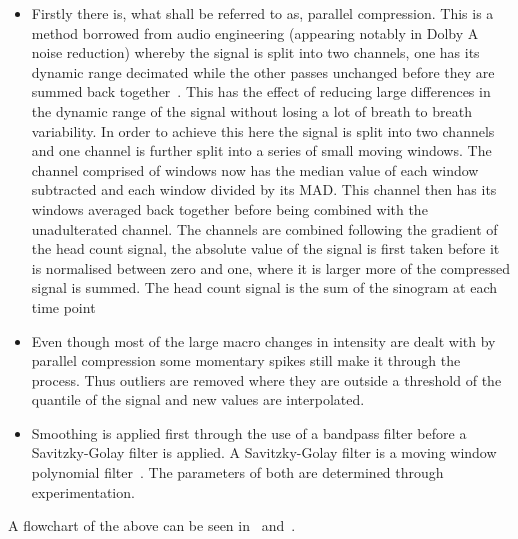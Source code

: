                     \begin{itemize}
                        \item Firstly there is, what shall be referred to as, parallel compression. This is a method borrowed from audio engineering (appearing notably in Dolby A noise reduction) whereby the signal is split into two channels, one has its dynamic range decimated while the other passes unchanged before they are summed back together~. This has the effect of reducing large differences in the dynamic range of the signal without losing a lot of breath to breath variability. In order to achieve this here the signal is split into two channels and one channel is further split into a series of small moving windows. The channel comprised of windows now has the median value of each window subtracted and each window divided by its \gls{MAD}. This channel then has its windows averaged back together before being combined with the unadulterated channel. The channels are combined following the gradient of the head count signal, the absolute value of the signal is first taken before it is normalised between zero and one, where it is larger more of the compressed signal is summed. The head count signal is the sum of the sinogram at each time point
                        
                        \item Even though most of the large macro changes in intensity are dealt with by parallel compression some momentary spikes still make it through the process. Thus outliers are removed where they are outside a threshold of the quantile of the signal and new values are interpolated.
                        
                        \item Smoothing is applied first through the use of a bandpass filter before a Savitzky-Golay filter is applied. A Savitzky-Golay filter is a moving window polynomial filter~. The parameters of both are determined through experimentation.
                    \end{itemize}
                    
                    A flowchart of the above can be seen in~ and~.
            
